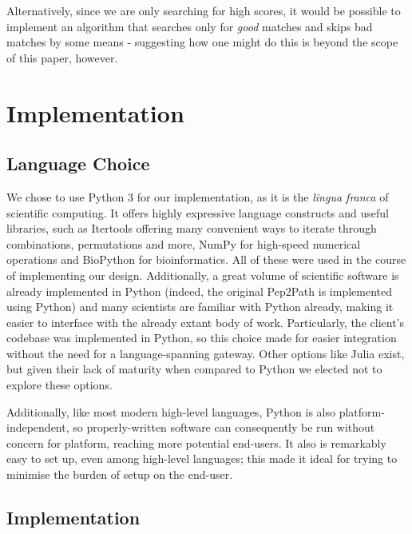 \documentclass{l4proj}
\newcommand{\cit}[1]{\citep{#1}}
\begin{document}
Alternatively, since we are only searching for high scores, it would be possible to implement an algorithm that searches only for \textit{good} matches and skips bad matches by some means - suggesting how one might do this is beyond the scope of this paper, however. 

\chapter{Implementation}

\section{Language Choice}

We chose to use Python 3 for our implementation, as it is the \textit{lingua franca} of scientific computing. It offers highly expressive language constructs and useful libraries, such as Itertools \cit{itools} offering many convenient ways to iterate through combinations, permutations and more, NumPy \cit{numpy} for high-speed numerical operations and BioPython \cit{biopy} for bioinformatics. All of these were used in the course of implementing our design. Additionally, a great volume of scientific software is already implemented in Python (indeed, the original Pep2Path is implemented using Python) and many scientists are familiar with Python already, making it easier to interface with the already extant body of work. Particularly, the client's codebase was implemented in Python, so this choice made for easier integration without the need for a language-spanning gateway. Other options like Julia \cit{julia} exist, but given their lack of maturity when compared to Python we elected not to explore these options. 

Additionally, like most modern high-level languages, Python is also platform-independent, so properly-written software can consequently be run without concern for platform, reaching more potential end-users. It also is remarkably easy to set up, even among high-level languages; this made it ideal for trying to minimise the burden of setup on the end-user.

\section{Implementation}
\end{document}
